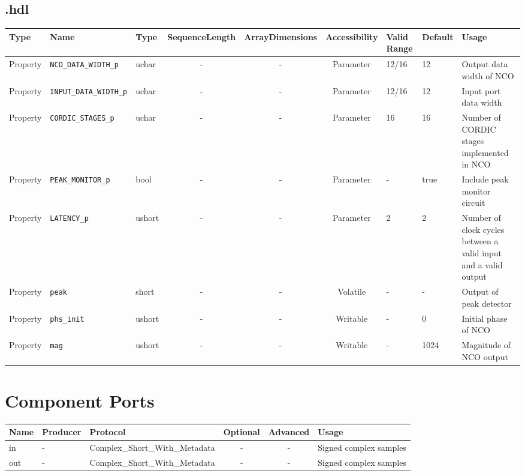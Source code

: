 \begin{landscape}
	\subsection*{\comp.hdl}
	\begin{scriptsize}
		\begin{tabular}{|p{1.5cm}|p{2.5cm}|p{1cm}|c|c|c|p{2cm}|p{1cm}|p{5cm}|}
			\hline
			\rowcolor{blue}
			Type     & Name                      	& Type  	& SequenceLength & ArrayDimensions & Accessibility	& Valid Range 	& Default & Usage\\
			\hline
			Property & \verb+NCO_DATA_WIDTH_p+		& uchar 	& -              & -               & Parameter		& 12/16       	& 12      & Output data width of NCO\\
			\hline
			Property & \verb+INPUT_DATA_WIDTH_p+	& uchar 	& -              & -               & Parameter		& 12/16       	& 12      & Input port data width\\
			\hline
			Property & \verb+CORDIC_STAGES_p+    	& uchar 	& -              & -               & Parameter		& 16          	& 16      & Number of CORDIC stages implemented in NCO\\
			\hline
			Property & \verb+PEAK_MONITOR_p+     	& bool  	& -              & -               & Parameter		& -				& true    & Include peak monitor circuit\\
			\hline
			Property & \verb+LATENCY_p+     	  	& ushort	& -              & -               & Parameter		& 2				& 2		  & Number of clock cycles between a valid input and a valid output\\
			\hline
			Property & \verb+peak+            		& short 	& -              & -               & Volatile		& -				& -       & Output of peak detector\\
			\hline
			Property & \verb+phs_init+    			& ushort 	& -              & -               & Writable 		& -           	& 0       & Initial phase of NCO\\
			\hline
			Property & \verb+mag+         			& ushort 	& -              & -               & Writable 		& -           	& 1024    & Magnitude of NCO output\\
			\hline
		\end{tabular}
	\end{scriptsize}

	\section*{Component Ports}
	\begin{scriptsize}
		\begin{tabular}{|M{2cm}|M{1.5cm}|M{4cm}|c|c|M{9cm}|}
			\hline
			\rowcolor{blue}
			Name & Producer & Protocol         				& Optional	& Advanced & Usage\\
			\hline
			in   & -		& Complex\_Short\_With\_Metadata	& -			& -        & Signed complex samples\\
			\hline
			out  & -		& Complex\_Short\_With\_Metadata	& -			& -        & Signed complex samples\\
			\hline
		\end{tabular}
	\end{scriptsize}


\end{landscape}
